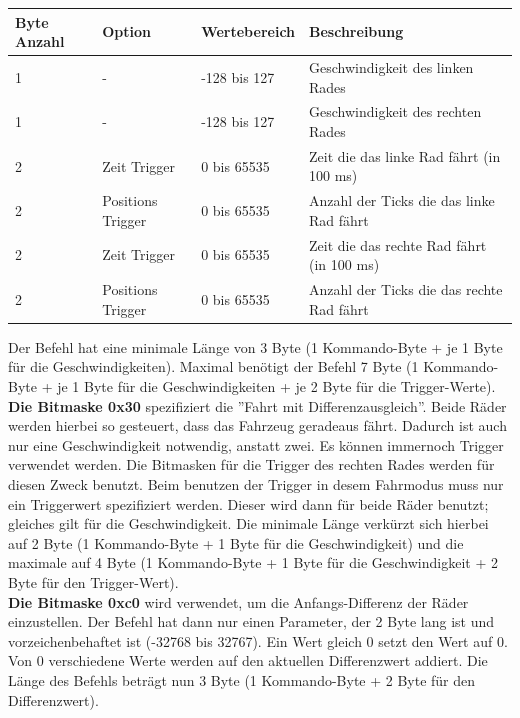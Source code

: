 \documentclass[a4paper]{article}
\begin{document}
	\begin{tabularx}{\linewidth}{|l|l|l|X|}
		\hline
		\textbf{Byte Anzahl} & \textbf{Option} & \textbf{Wertebereich} & \textbf{Beschreibung} \\
		\hline
		\hline
		1					 & - & -128 bis 127 & Geschwindigkeit des linken Rades \\
		\hline
		1					 & - & -128 bis 127 & Geschwindigkeit des rechten Rades\\
		\hline
		2					 & Zeit Trigger & 0 bis 65535 &  Zeit die das linke Rad fährt (in 100 ms)\\
		\hline
		2					 & Positions Trigger & 0 bis 65535 &  Anzahl der Ticks die das linke Rad fährt\\
		\hline
		2					 & Zeit Trigger & 0 bis 65535 &  Zeit die das rechte Rad fährt (in 100 ms)\\
		\hline
		2					 & Positions Trigger & 0 bis 65535 &  Anzahl der Ticks die das rechte Rad fährt\\
		\hline
	\end{tabularx}

	Der Befehl hat eine minimale Länge von 3 Byte (1 Kommando-Byte + je 1
	Byte für die Geschwindigkeiten). Maximal benötigt der Befehl 7 Byte
	(1 Kommando-Byte + je 1 Byte für die Geschwindigkeiten + je 2 Byte für
	die Trigger-Werte).
	\\
	\textbf{Die Bitmaske 0x30} spezifiziert die ''Fahrt mit Differenzausgleich''.
	Beide Räder werden hierbei so gesteuert, dass das Fahrzeug geradeaus fährt.
	Dadurch ist auch nur eine Geschwindigkeit notwendig, anstatt zwei. Es können
	immernoch Trigger verwendet werden. Die Bitmasken für die Trigger des rechten
	Rades werden für diesen Zweck benutzt. Beim benutzen der Trigger in desem
	Fahrmodus muss nur ein Triggerwert spezifiziert werden. Dieser wird dann für
	beide Räder benutzt; gleiches gilt für die Geschwindigkeit. Die minimale
	Länge verkürzt sich hierbei auf 2 Byte (1 Kommando-Byte + 1 Byte für die
	Geschwindigkeit) und die maximale auf 4 Byte (1 Kommando-Byte + 1 Byte für
	die Geschwindigkeit + 2 Byte für den Trigger-Wert).
	\\
	\textbf{Die Bitmaske 0xc0} wird verwendet, um die Anfangs-Differenz der Räder
	einzustellen. Der Befehl hat dann nur einen Parameter, der 2 Byte lang ist und
	vorzeichenbehaftet ist (-32768 bis 32767). Ein Wert gleich 0 setzt den Wert
	auf 0. Von 0 verschiedene Werte werden auf den aktuellen Differenzwert
	addiert. Die Länge des Befehls beträgt nun 3 Byte (1 Kommando-Byte + 2 Byte
	für den Differenzwert).
\end{document}
